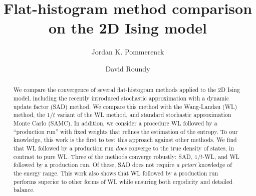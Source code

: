 \documentclass[letterpaper,twocolumn,amsmath,amssymb,pre,aps,10pt]{revtex4-1}
\begin{document}
\title{Flat-histogram method comparison on the 2D Ising model
}

\author{Jordan K. Pommerenck} \author{David Roundy}

\begin{abstract}

We compare the convergence of several flat-histogram methods applied to the 2D
Ising model, including the recently introduced stochastic approximation with a
dynamic update factor (SAD) method. We compare this method with the Wang-Landau
(WL) method, the $1/t$ variant of the WL method, and standard stochastic
approximation Monte Carlo (SAMC). In addition, we consider a procedure WL
followed by a ``production run'' with fixed weights that refines the estimation
of the entropy. To our knowledge, this work is the first to test this approach
against other methods. We find that WL followed by a production run \emph{does}
converge to the true density of states, in contrast to pure WL. Three of the
methods converge robustly: SAD, $1/t$-WL, and WL followed by a production run.
Of these, SAD does not require \emph{a priori} knowledge of the energy range.
This work also shows that WL followed by a production run performs superior to
other forms of WL while ensuring both ergodicity and detailed balance.

\end{abstract}

\maketitle




\end{document}
